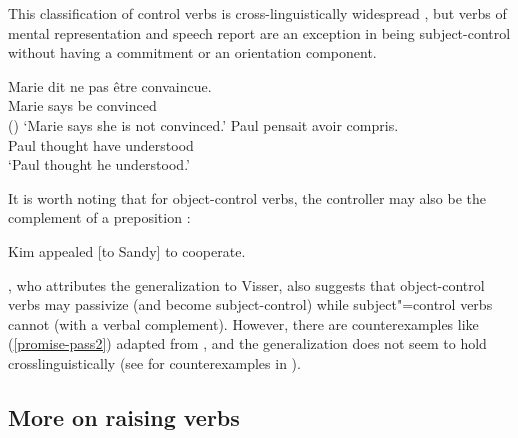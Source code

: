 This classification of control verbs is cross-linguistically widespread \citep{VanValinandLapolla1997}, but  verbs of mental representation and speech report are an exception in being subject-control without having a commitment or an orientation component.


\begin{exe}
\ex \begin{xlist}
\ex 
\gll Marie dit {ne pas} \^etre convaincue.\\
     Marie says  be convinced \\\hfill()
\glt `Marie says she is not convinced.'	
\ex 
\gll Paul pensait  avoir compris. \\
     Paul thought have understood \\
\glt `Paul thought he understood.'
 \end{xlist}
\end{exe}

\largerpage[2]
It is worth noting that for object-control verbs, the controller may also be the complement of a preposition \citep[]{PollardandSag1994}:

\begin{exe}
\ex Kim appealed [to Sandy] to cooperate. \label{to}
\end{exe}


 
\citet[]{Bresnan1982}, who attributes the generalization to Visser, also suggests that
object-control verbs may passivize (and become subject-control) while subject"=control verbs cannot
(with a verbal complement). However, there are counterexamples like (\ref{promise-pass2}) adapted
from \citet[]{JB1976a-u}, and the generalization does not seem to hold crosslinguistically
(see \citealt[]{Mueller2002b} for counterexamples in ).

\eal
{}\label{persuade-pass}
\label{promise-pass}
\label{promise-pass2}
\zl

 
\subsection{More on raising verbs}
\label{sec-more-on-raising-verbs}

